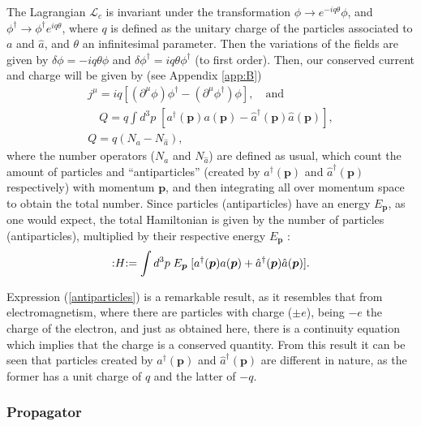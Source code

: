 The Lagrangian $\mathcal{L}_c$ is invariant under the transformation $\phi \rightarrow e^{-iq\theta}\phi$, and $\phi^{\dagger} \rightarrow \phi^{\dagger} e^{iq\theta}$, where $q$ is defined as the unitary charge of the particles associated to $a$ and $\hat{a}$, and $\theta$ an infinitesimal parameter. Then the variations of the fields are given by $\delta\phi = -iq\theta\phi$ and $\delta\phi^{\dagger} = iq\theta\phi^{\dagger}$ (to first order). Then, our conserved current and charge will be given by (see Appendix \ref{app:B})
\begin{gather}
    j^{\mu} = iq[(\partial^{\mu}\phi)\phi^{\dagger} - (\partial^{\mu}\phi^{\dagger})\phi], \quad \textrm{and} \nonumber \\
    \quad Q = q\int d^3p \; [a^{\dagger}(\bm{p})a(\bm{p}) - \hat{a}^{\dagger}(\bm{p})\hat{a}(\bm{p})], \nonumber \\
\label{antiparticles}
    Q = q(N_a - N_{\hat{a}}),
\end{gather}
where the number operators ($N_a$ and $N_{\hat{a}}$) are defined as usual, which count the amount of particles and ``antiparticles'' (created by $a^{\dagger}(\bm{p})$ and $\hat{a}^{\dagger}(\bm{p})$ respectively) with momentum $\bm{p}$, and then integrating all over momentum space to obtain the total number. Since particles (antiparticles) have an energy $E_{\bm{p}}$, as one would expect, the total Hamiltonian is given by the number of particles (antiparticles), multiplied by their respective energy $E_{\bm{p}}$ \cite{Lahiri}:
\begin{equation*}
    :\mathrel{H}: = \int d^3p \; E_{\bm{p}} \; [a^{\dagger}(\bm{p})a(\bm{p}) + \hat{a}^{\dagger}(\bm{p})\hat{a}(\bm{p})].
\end{equation*}

Expression (\ref{antiparticles}) is a remarkable result, as it resembles that from electromagnetism, where there are particles with charge ($\pm e$), being $-e$ the charge of the electron, and just as obtained here, there is a continuity equation which implies that the charge is a conserved quantity. From this result it can be seen that particles created by $a^{\dagger}(\bm{p})$ and $\hat{a}^{\dagger}(\bm{p})$ are different in nature, as the former has a unit charge of $q$ and the latter of $-q$. 

\subsubsection{Propagator} \label{ssec:scalarpropagator}

